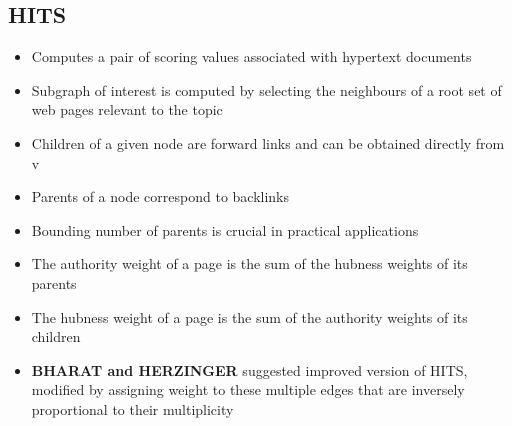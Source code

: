 \documentclass[11pt]{report}
\begin{document}
\subsection{HITS}
\begin{itemize}
\item Computes a pair of scoring values associated with hypertext documents
\item Subgraph of interest is computed by selecting the neighbours of a root set of web pages relevant to the topic
\item Children of a given node are forward links and can be obtained directly from v
\item Parents of a node correspond to backlinks
\item Bounding number of parents is crucial in practical applications
\item The authority weight of a page is the sum of the hubness weights of its parents
\item The hubness weight of a page is the sum of the authority weights of its children
\item \textbf{BHARAT and HERZINGER} suggested improved version of HITS, modified by assigning weight to these multiple edges that are inversely proportional to their multiplicity
\end{itemize}
\end{document}
